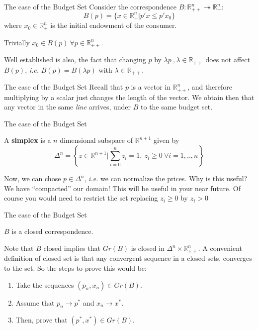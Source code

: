 \documentclass[aspectratio=169]{beamer}
\begin{document}
\begin{frame}{The case of the Budget Set}
    Consider the correspondence $B: \mathds{R}^n_{++}\twoheadrightarrow\mathds{R}^n_+$:
    \[B(p) = \{x\in\mathds{R}^n_+ | p'x\leq p'x_0\}\]
    where $x_0\in \mathds{R}^n_{+}$ is the initial endowment of the consumer.
    
    \pause

    Trivially $x_0\in B(p)\ \forall p\in\mathds{R}^n_{++}$.

    \pause

    Well established is also, the fact that changing $p$ by $\lambda p\ , \lambda\in\mathds{R}_{++}$ does not affect $B(p)$, \textit{i.e.} $B(p)=B(\lambda p)$ with $\lambda\in\mathds{R}_{++}$.
\end{frame}

\begin{frame}{The case of the Budget Set}
    Recall that $p$ is a vector in $\mathds{R}^n_{++}$, and therefore multiplying by a scalar just changes the length of the vector. We obtain then that any vector in the same \textit{line} arrives, under $B$ to the same budget set.
\end{frame}

\begin{frame}{The case of the Budget Set}
    \begin{definition}
        A \textbf{simplex} is a $n$ dimensional subspace of $\mathds{R}^{n+1}$ given by \[\Delta^n=\left\{z\in\mathbb{R}^{n+1}|\sum_{i=0}^n z_i = 1,\ z_i\geq 0\ \forall i=1,..,n\right\}\]
    \end{definition}

    Now, we can chose $p\in\Delta^n$, \textit{i.e.} we can normalize the prices. Why is this useful? \pause We have ``compacted'' our domain! This will be useful in your near future. Of course you would need to restrict the set replacing $z_i\geq 0$ by $z_i>0$
\end{frame}

\begin{frame}{The case of the Budget Set}
    \begin{theorem}
        $B$ is a closed correspondence.
    \end{theorem}
    
    Note that $B$ closed implies that $Gr(B)$ is closed in $\Delta^n\times \mathds{R}_{++}^n$. A convenient definition of closed set is that any convergent sequence in a closed sets, converges to the set. So the steps to prove this would be:
    \begin{enumerate}
        \item Take the sequences $(p_n,x_n)\in Gr(B)$.
        \item Assume that $p_n\rightarrow p^*$ and $x_n\rightarrow x^*$.
        \item Then, prove that $(p^*, x^*)\in Gr(B)$.
    \end{enumerate}
    
\end{frame}
\end{document}
